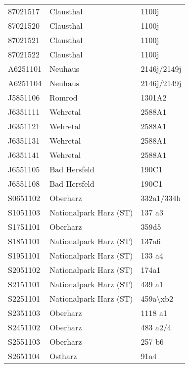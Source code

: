 \begin{singlespace}
{\begin{longtabu}{l l L}
      87021517 & Clausthal & 1100j \\
      87021520 & Clausthal & 1100j \\
      87021521 & Clausthal & 1100j \\
      87021522 & Clausthal & 1100j \\
      A6251101 & Neuhaus & 2146j/2149j \\
      A6251104 & Neuhaus & 2146j/2149j \\
      J5851106 & Romrod & 1301A2 \\
      J6351111 & Wehretal & 2588A1 \\
      J6351121 & Wehretal & 2588A1 \\
      J6351131 & Wehretal & 2588A1 \\
      J6351141 & Wehretal & 2588A1 \\
      J6551105 & Bad Hersfeld & 190C1 \\
      J6551108 & Bad Hersfeld & 190C1 \\
      S0651102 & Oberharz & 332a1/334h \\
      S1051103 & Nationalpark Harz (ST) & 137 a3 \\
      S1751101 & Oberharz & 359d5 \\
      S1851101 & Nationalpark Harz (ST) & 137a6 \\
      S1951101 & Nationalpark Harz (ST) & 133 a4 \\
      S2051102 & Nationalpark Harz (ST) & 174a1 \\
      S2151101 & Nationalpark Harz (ST) & 439 a1 \\
      S2251101 & Nationalpark Harz (ST) & 459a\textbackslash{}xb2 \\
      S2351103 & Oberharz & 1118 a1 \\
      S2451102 & Oberharz & 483 a2/4 \\
      S2551103 & Oberharz & 257 b6 \\
      S2651104 & Ostharz & 91a4 \\
    \end{longtabu}
  }
\end{singlespace}


